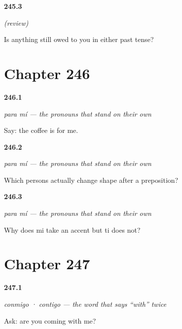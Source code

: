 \noindent\begin{minipage}[t]{\linewidth}
\raggedright
\hypertarget{review-ES-C63-repaso-paradigmas-owed}{\textbf{245.3}} \emph{(review)}\par
\small Is anything still owed to you in either past tense?
\end{minipage}\par\medskip

\section*{Chapter 246}

\noindent\begin{minipage}[t]{\linewidth}
\raggedright
\hypertarget{review-ES-C64-para-mi-say}{\textbf{246.1}} \emph{para mí — the pronouns that stand on their own}\par
\small Say: the coffee is for me.
\end{minipage}\par\medskip

\noindent\begin{minipage}[t]{\linewidth}
\raggedright
\hypertarget{review-ES-C64-para-mi-third}{\textbf{246.2}} \emph{para mí — the pronouns that stand on their own}\par
\small Which persons actually change shape after a preposition?
\end{minipage}\par\medskip

\noindent\begin{minipage}[t]{\linewidth}
\raggedright
\hypertarget{review-ES-C64-para-mi-accent}{\textbf{246.3}} \emph{para mí — the pronouns that stand on their own}\par
\small Why does mi take an accent but ti does not?
\end{minipage}\par\medskip

\section*{Chapter 247}

\noindent\begin{minipage}[t]{\linewidth}
\raggedright
\hypertarget{review-ES-C64-conmigo-ask}{\textbf{247.1}} \emph{conmigo · contigo — the word that says \textquotedblleft{}with\textquotedblright{} twice}\par
\small Ask: are you coming with me?
\end{minipage}\par\medskip

